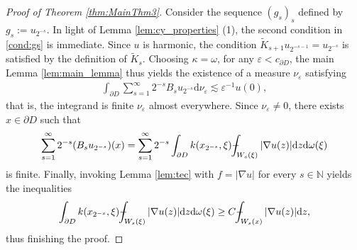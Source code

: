 \documentclass[a4paper,12pt]{article}
\theoremstyle{definition}
\theoremstyle{definition}
\def\Xint#1{\mathchoice
	{\XXint\displaystyle\textstyle{#1}}%
	{\XXint\textstyle\scriptstyle{#1}}%
	{\XXint\scriptstyle\scriptscriptstyle{#1}}%
	{\XXint\scriptscriptstyle\scriptscriptstyle{#1}}%
	\!\int}
\def\XXint#1#2#3{{\setbox0=\hbox{$#1{#2#3}{\int}$ }
		\vcenter{\hbox{$#2#3$ }}\kern-.568\wd0}}
\def\dashint{\Xint-}
\begin{document}
	\begin{proof}[Proof of Theorem \ref{thm:MainThm3}]
		Consider the sequence $(g_s)_s$ defined by $g_s:= u_{2^{-s}}$. In light of Lemma \ref{lem:cy_properties} (1), the second condition in \eqref{cond:gs} is immediate. Since $u$ is harmonic, the condition $\tilde K_{s+1}u_{2^{-s-1}}=u_{2^{-s}}$ is satisfied by the definition of $\tilde K_s$. Choosing $\kappa=\omega$, for any $\varepsilon<c_{\partial D}$, the main Lemma \ref{lem:main_lemma} thus yields the existence of a measure $\nu_{\varepsilon}$ satisfying
		\begin{align}\label{eq:NuIntFinite}
			\int_{\partial D}\sum_{s=1}^{\infty}2^{-s} B_su_{2^{-s}}\mathrm d\nu_{\varepsilon}\lesssim \varepsilon^{-1}u(0),
		\end{align}
		that is, the integrand is finite $\nu_{\varepsilon}$ almost everywhere. Since $\nu_\varepsilon\neq0$, there exists $x\in\partial D$ such that
		\begin{align}\label{eq:explicitBRep}
			\sum_{s=1}^{\infty}2^{-s} (B_su_{2^{-s}})(x)=\sum_{s=1}^{\infty}2^{-s}\int_{\partial D} k(x_{2^{-s}},\xi)\dashint_{W_s(\xi)}|\nabla u(z)|\mathrm dz\mathrm d\omega(\xi)
		\end{align}
		is finite. Finally, invoking Lemma \ref{lem:tec} with $f=|\nabla u|$ for every $s\in\mathbb N$ yields the inequalities
		\begin{align*}%
			\int_{\partial D} k(x_{2^{-s}},\xi)\dashint_{W_s(\xi)}|\nabla u(z)|\mathrm dz\mathrm d\omega(\xi)\geq C\dashint_{W_s(x)}|\nabla u(z)|\mathrm dz,
		\end{align*}
		thus finishing the proof.
	\end{proof}
\end{document}
